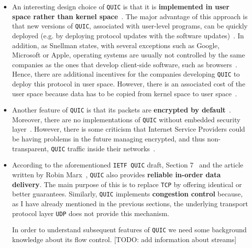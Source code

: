 \documentclass[12pt,a4paper,twoside,openright]{report}
\begin{document}
\begin{itemize}
  

  \item 
  An interesting design choice of \texttt{QUIC} is that it is \textbf{implemented in user space rather than kernel space}~\cite{the-road-to-quic, Implementation_and_Performance_Evaluation_of_the_QUIC_Protocol_in_Linux_Kernel}.
  The major advantage of this approach is that new versions of \texttt{QUIC}, associated with user-level programs, can be quickly deployed (e.g. by deploying protocol updates with the software updates)~\cite{the-road-to-quic}.
  In addition, as Snellman states, with several exceptions such as Google, Microsoft or Apple, operating systems are usually not controlled by the same companies as the ones that develop client-side software, such as browsers~\cite{2016-12-01-quic-tou}.
  Hence, there are additional incentives for the companies developing \texttt{QUIC} to deploy this protocol in user space.
  However, there is an associated cost of the user space because data has to be copied from kernel space to user space~\cite{benchmarking-quic}.
  
  
 
  \item Another feature of \texttt{QUIC} is that its packets are \textbf{encrypted by default}~\cite{the-road-to-quic}.
  Moreover, there are no implementations of \texttt{QUIC} without embedded security layer~\cite{head-of-line-blocking-in-quic-and-http-3-the-details}.
  However, there is some criticism that Internet Service Providers could be having problems in the future managing encrypted, and thus non-transparent, \texttt{QUIC} traffic inside their networks~\cite{why-is-googles-quic-leaving-network-operators-in-the-dark}.
  
  


  \item 
    According to the aforementioned \texttt{IETF QUIC} draft, Section 7~\cite{ietf-quic-transport-draft} and 
    the article written by Robin Marx~\cite{head-of-line-blocking-in-quic-and-http-3-the-details}, \texttt{QUIC} also provides \textbf{reliable in-order data delivery}.
    The main purpose of this is to replace \texttt{TCP} by offering identical or better guarantees. 
    Similarly, \texttt{QUIC} implements \textbf{congestion control} because, as I have already mentioned in the previous sections, the underlying transport protocol layer \texttt{UDP} does not provide this mechanism. 
  
  
  In order to understand subsequent features of \texttt{QUIC} we need some background knowledge about its flow control.
  [TODO: add information about streams]
  

\end{itemize}
\end{document}

